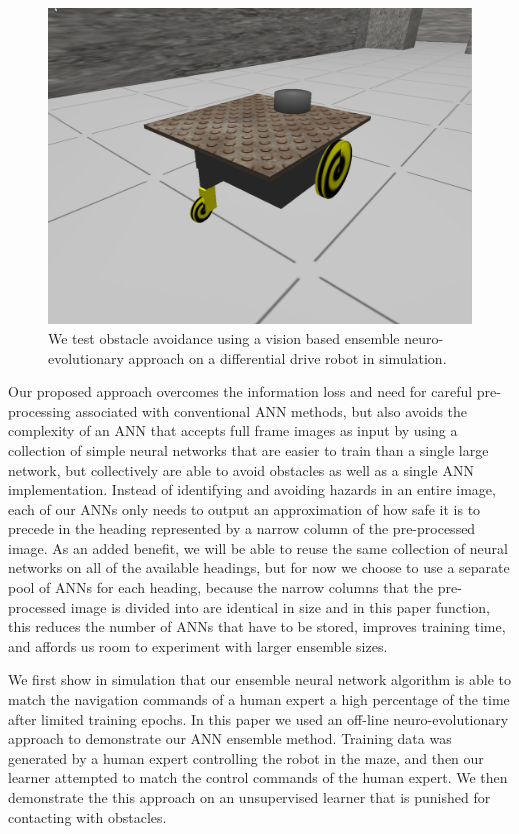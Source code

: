 \documentclass{article}
\begin{document}
		\begin{figure}[t]
			\begin{center}
				\includegraphics[width=\columnwidth]{robot1.png}
			\end{center}
			\caption{We test obstacle avoidance using a vision based ensemble neuro-evolutionary approach on a differential drive robot in simulation.}
			\label{robot}
		\end{figure}

		Our proposed approach overcomes the information loss and need for careful pre-processing associated with conventional ANN methods, but also avoids the complexity of an ANN that accepts full frame images as input by using a collection of simple neural networks that are easier to train than a single large network, but collectively are able to avoid obstacles as well as a single ANN implementation.  Instead of identifying and avoiding hazards in an entire image, each of our ANNs only needs to output an approximation of how safe it is to precede in the heading represented by a narrow column of the pre-processed image.  As an added benefit, we will be able to reuse the same collection of neural networks on all of the available headings, but for now we choose to use a separate pool of ANNs for each heading, because the narrow columns that the pre-processed image is divided into are identical in size and in this paper function, this reduces the number of ANNs that have to be stored, improves training time, and affords us room to experiment with larger ensemble sizes.

		We first show in simulation that our ensemble neural network algorithm is able to match the navigation commands of a human expert a high percentage of the time after limited training epochs.  In this paper we used an off-line neuro-evolutionary approach to demonstrate our ANN ensemble method.  Training data was generated by a human expert controlling the robot in the maze, and then our learner attempted to match the control commands of the human expert.  We then demonstrate the this approach on an unsupervised learner that is punished for contacting with obstacles.
\end{document}
